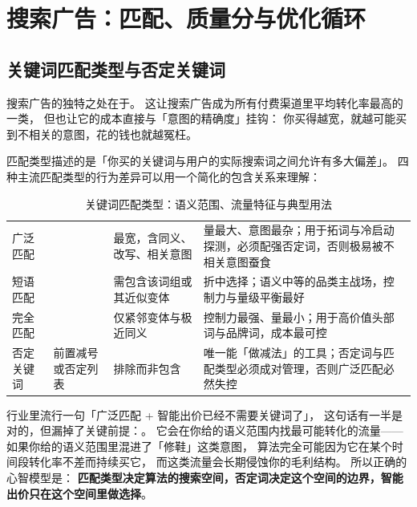 \section{搜索广告：匹配、质量分与优化循环}
\label{sec:g-search}

\subsection{关键词匹配类型与否定关键词}

搜索广告的独特之处在于。
这让搜索广告成为所有付费渠道里平均转化率最高的一类，
但也让它的成本直接与「意图的精确度」挂钩：
你买得越宽，就越可能买到不相关的意图，花的钱也就越冤枉。

匹配类型描述的是「你买的关键词与用户的实际搜索词之间允许有多大偏差」。
四种主流匹配类型的行为差异可以用一个简化的包含关系来理解：

\begin{table}[htbp]
\centering
\caption{关键词匹配类型：语义范围、流量特征与典型用法}
\label{tab:g-matchtypes}
\small
\begin{tabularx}{\textwidth}{L{2.0cm} L{3.0cm} L{3.1cm} Y}
\toprule
{} &  &  &  \\
\midrule
广泛匹配 &  & 最宽，含同义、改写、相关意图 & 量最大、意图最杂；用于拓词与冷启动探测，必须配强否定词，否则极易被不相关意图蚕食 \\
\addlinespace
短语匹配 &  & 需包含该词组或其近似变体 & 折中选择；语义中等的品类主战场，控制力与量级平衡最好 \\
\addlinespace
完全匹配 &  & 仅紧邻变体与极近同义 & 控制力最强、量最小；用于高价值头部词与品牌词，成本最可控 \\
\addlinespace
否定关键词 & 前置减号或否定列表 & 排除而非包含 & 唯一能「做减法」的工具；否定词与匹配类型必须成对管理，否则广泛匹配必然失控 \\
\bottomrule
\end{tabularx}
\end{table}

行业里流行一句「广泛匹配 + 智能出价已经不需要关键词了」，
这句话有一半是对的，但漏掉了关键前提：。
它会在你给的语义范围内找最可能转化的流量——
如果你给的语义范围里混进了「修鞋」这类意图，
算法完全可能因为它在某个时间段转化率不差而持续买它，
而这类流量会长期侵蚀你的毛利结构。
所以正确的心智模型是：
\textbf{匹配类型决定算法的搜索空间，否定词决定这个空间的边界，智能出价只在这个空间里做选择}。


